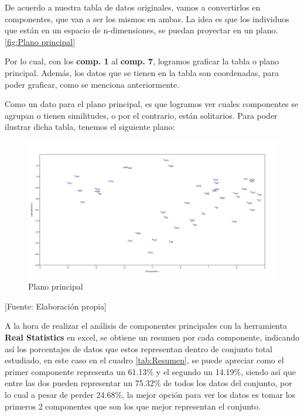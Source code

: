 De acuerdo a nuestra tabla de datos originales, vamos a convertirlos en componentes, que van a ser los mismos en ambas. La idea es que los individuos que están en un espacio de n-dimensiones, se puedan proyectar en un plano. \ref{fig:Plano principal} 

Por lo cual, con los \textbf{comp. 1} al \textbf{comp. 7}, logramos graficar la tabla o plano principal. Además, los datos que se tienen en la tabla son coordenadas, para poder graficar, como se menciona anteriormente. 

Como un dato para el plano principal, es que logramos ver cuales componentes se agrupan o tienen similitudes, o por el contrario, están solitarios. Para poder ilustrar dicha tabla, tenemos el siguiente plano:


\begin{figure}[H]
        \centering
        \caption{Plano principal}
        \includegraphics[width=1\textwidth]{figures/Grafico_C1_C2!.jpg}
        
\end{figure}
\begin{center}
    [Fuente:  Elaboración propia]
    \label{fig:Plano principal}
\end{center}


A la hora de realizar el análisis  de componentes principales con la herramienta \textbf{Real Statistics} en excel, se obtiene un resumen por cada componente, indicando así los porcentajes de datos que estos representan dentro de conjunto total estudiado, en este caso en el cuadro \ref{tab:Resumen}, se puede apreciar como el primer componente representa un 61.13\% y el segundo un 14.19\%, siendo así que entre las dos pueden representar un 75.32\% de todos los datos del conjunto, por lo cual a pesar de perder 24.68\%, la mejor opción para ver los datos es tomar los primeros 2 componentes que son los que mejor representan el conjunto.

